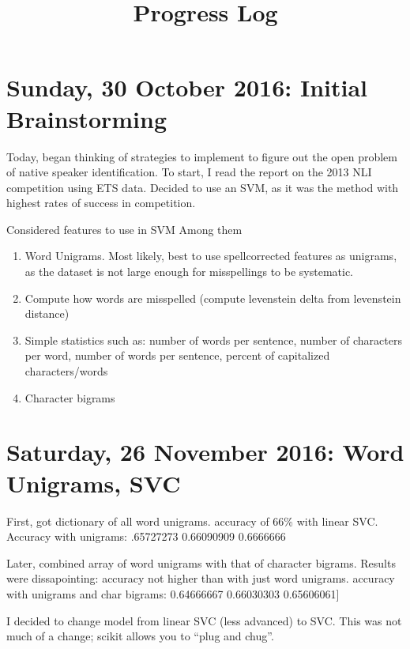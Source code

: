 \documentclass{article}
\title{Progress Log}
\begin{document}
\section{Sunday, 30 October 2016: Initial Brainstorming}

	Today, began thinking of strategies to implement to figure out the open problem of native speaker identification. 
	To start, I read the report on the 2013 NLI competition using ETS data. 
	Decided to use an SVM, as it was the method with highest rates of success in competition. 
	
	Considered features to use in SVM Among them 
	\begin{enumerate}
		\item Word Unigrams. Most likely, best to use spellcorrected features as unigrams, as the dataset is not large enough for misspellings to be systematic.  
			
		\item Compute how words are misspelled (compute levenstein delta from levenstein distance)
		\item Simple statistics such as: number of words per sentence, number of characters per word, number of words per sentence, percent of capitalized characters/words
		\item Character bigrams			
			
	\end{enumerate}

\section{Saturday,  26 November 2016: Word Unigrams, SVC}

First, got dictionary of all word unigrams. accuracy of 66\% with linear SVC.\\
Accuracy with unigrams:
.65727273  0.66090909  0.6666666

Later, combined array of word unigrams with that of character bigrams. Results were dissapointing: accuracy not higher than with just word unigrams. 
accuracy with unigrams and char bigrams: 0.64666667  0.66030303  0.65606061]

I decided to change model from linear SVC (less advanced) to SVC. 
This was not much of a change; scikit allows you to ``plug and chug''.  
\end{document}
